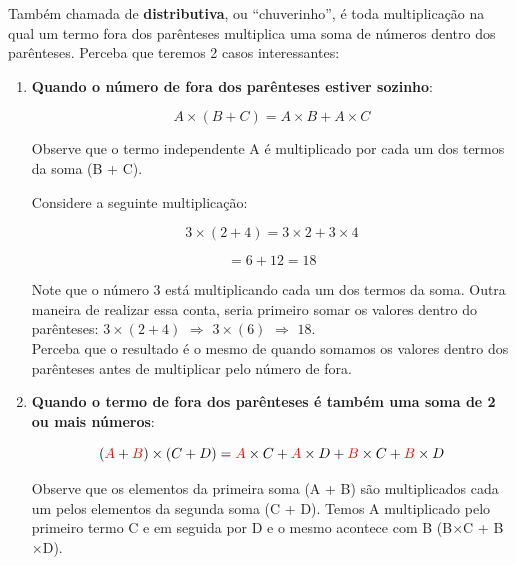 Também chamada de \textbf{distributiva}, ou ``chuverinho'', é toda multiplicação na qual um termo fora dos parênteses multiplica uma soma de números dentro dos parênteses. Perceba que teremos 2 casos interessantes: 

\begin{enumerate}
    \item \textbf{Quando o número de fora dos parênteses estiver sozinho}:

    \begin{equation}
        A\times(B+C)=A\times B+A \times C
    \end{equation}

    Observe que o termo independente A é multiplicado por cada um dos termos da soma (B + C).

    \begin{exemplo}
        Considere a seguinte multiplicação:

        \begin{equation}
            3\times(2+4)= 3 \times 2 + 3 \times 4
        \end{equation}

        \begin{equation}
            =6+12=18
        \end{equation}

        Note que o número 3 está multiplicando cada um dos termos da soma. Outra maneira de realizar essa conta, seria primeiro somar os valores dentro do parênteses: $3\times(2 + 4)$ \(\Rightarrow\) $3\times(6)$ \(\Rightarrow\) $18$. \\

        Perceba que o resultado é o mesmo de quando somamos os valores dentro dos parênteses antes de multiplicar pelo número de fora.
    \end{exemplo}

    \item \textbf{Quando o termo de fora dos parênteses é também uma soma de 2 ou mais números}:

    \begin{equation}
        (\textcolor{red}{A} + \textcolor{red}{B})\times(C + D) = \textcolor{red}{A}\times C + \textcolor{red}{A}\times D + \textcolor{red}{B}\times C + \textcolor{red}{B}\times D 
    \end{equation}

    Observe que os elementos da primeira soma (A + B) são multiplicados cada um pelos elementos da segunda soma (C + D). Temos A multiplicado pelo primeiro termo C e em seguida por D e o mesmo acontece com B (B\(\times\)C + B\(\times\)D).


\end{enumerate}
